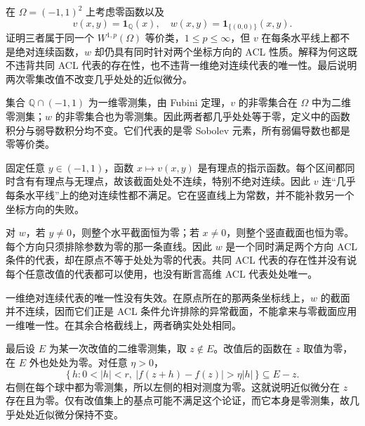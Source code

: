 \begin{exercise}\label{b1:ex:21-acl-representative-choices}
在 \(\Omega=(-1,1)^2\) 上考虑零函数以及
\[
 v(x,y)=\mathbf1_{\mathbb Q}(x),\quad
 w(x,y)=\mathbf1_{\{(0,0)\}}(x,y).
\]
证明三者属于同一个 \(W^{1,p}(\Omega)\) 等价类，\(1\le p\le\infty\)，但 \(v\) 在每条水平线上都不是绝对连续函数，\(w\) 却仍具有同时针对两个坐标方向的 ACL 性质。解释为何这既不违背共同 ACL 代表的存在性，也不违背一维绝对连续代表的唯一性。最后说明两次零集改值不改变几乎处处的近似微分。
\end{exercise}
\begin{solution}
集合 \(\mathbb Q\cap(-1,1)\) 为一维零测集，由 Fubini 定理，\(v\) 的非零集合在 \(\Omega\) 中为二维零测集；\(w\) 的非零集合也为零测集。因此两者都几乎处处等于零，定义中的函数积分与弱导数积分均不变。它们代表的是零 Sobolev 元素，所有弱偏导数也都是零等价类。

固定任意 \(y\in(-1,1)\)，函数 \(x\mapsto v(x,y)\) 是有理点的指示函数。每个区间都同时含有有理点与无理点，故该截面处处不连续，特别不绝对连续。因此 \(v\) 连“几乎每条水平线”上的绝对连续性都不满足。它在竖直线上为常数，并不能补救另一个坐标方向的失败。

对 \(w\)，若 \(y\ne0\)，则整个水平截面恒为零；若 \(x\ne0\)，则整个竖直截面也恒为零。每个方向只须排除参数为零的那一条直线。因此 \(w\) 是一个同时满足两个方向 ACL 条件的代表，却在原点不等于处处为零的代表。共同 ACL 代表的存在性并没有说每个任意改值的代表都可以使用，也没有断言高维 ACL 代表处处唯一。

一维绝对连续代表的唯一性没有失效。在原点所在的那两条坐标线上，\(w\) 的截面并不连续，因而它们正是 ACL 条件允许排除的异常截面，不能拿来与零截面应用一维唯一性。在其余合格截线上，两者确实处处相同。

最后设 \(E\) 为某一次改值的二维零测集，取 \(z\notin E\)。改值后的函数在 \(z\) 取值为零，在 \(E\) 外也处处为零。对任意 \(\eta>0\)，
\[
 \{\,h:0<|h|<r,\ |f(z+h)-f(z)|>\eta|h|\,\}
 \subseteq E-z.
\]
右侧在每个球中都为零测集，所以左侧的相对测度为零。这就说明近似微分在 \(z\) 存在且为零。仅有改值集上的基点可能不满足这个论证，而它本身是零测集，故几乎处处近似微分保持不变。
\end{solution}

